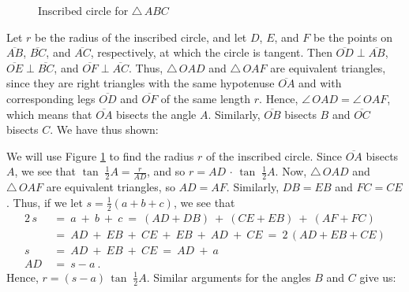 \begin{figure}[h]
 \begin{center}
  \vspace{-6mm}
 \end{center}
 \caption[]{\quad Inscribed circle for $\triangle\,ABC$}
 \label{fig:inscribed}
\end{figure}

Let $r$ be the radius of the inscribed circle, and let $D$, $E$, and $F$ be the points on
$\overline{AB}$, $\overline{BC}$, and $\overline{AC}$, respectively, at which the circle is tangent.
Then $\overline{OD} \perp \overline{AB}$, $\overline{OE} \perp \overline{BC}$, and $\overline{OF}
\perp \overline{AC}$. Thus, $\triangle\,OAD$ and $\triangle\,OAF$ are equivalent triangles,
since they are right triangles with the same hypotenuse $\overline{OA}$ and with corresponding legs
$\overline{OD}$ and $\overline{OF}$ of the same length $r$. Hence, $\angle\,OAD =\angle\,OAF$, which
means that $\overline{OA}$ bisects the angle $A$. Similarly, $\overline{OB}$ bisects $B$ and
$\overline{OC}$ bisects $C$. We have thus shown:\vspace{2mm}

\newpage
We will use Figure \ref{fig:inscribed} to find the radius $r$ of the inscribed circle. 
Since $\overline{OA}$ bisects $A$, we see that $\tan\;\frac{1}{2}A = \frac{r}{AD}$, and so
$r = AD \,\cdot\, \tan\;\frac{1}{2}A$. Now,
$\triangle\,OAD$ and $\triangle\,OAF$ are equivalent triangles, so $AD =
AF$. Similarly, $DB = EB$ and $FC = CE$. Thus, if we let $s=\frac{1}{2}(a+b+c)$, we see that
\begin{align*}
 2\,s ~&=~ a ~+~ b ~+~ c ~=~ (AD + DB ) ~+~ (CE + EB) ~+~ (AF + FC)\\
 &=~ AD ~+~ EB ~+~ CE ~+~ EB ~+~ AD ~+~ CE ~=~ 2\,(AD + EB + CE)\\
 s ~&=~ AD ~+~ EB ~+~ CE ~=~ AD ~+~ a\\
 AD ~&=~ s - a ~.
\end{align*}
Hence, $r = (s-a)\,\tan\;\frac{1}{2}A$. Similar arguments for the angles $B$ and $C$ give us:

